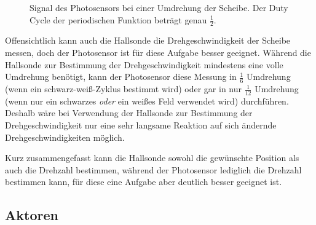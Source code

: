 \documentclass{kis}
\begin{document}
\begin{figure}
	\centering
	
	\caption[Signal des Photosensors bei einer Umdrehung der Scheibe.]{Signal des Photosensors bei einer Umdrehung der Scheibe. Der Duty Cycle der periodischen Funktion beträgt genau $\frac{1}{2}$.}
	\label{fig:photosensor}
\end{figure}

Offensichtlich kann auch die Hallsonde die Drehgeschwindigkeit der Scheibe messen, doch der Photosensor ist für diese Aufgabe besser geeignet. Während die Hallsonde zur Bestimmung der Drehgeschwindigkeit mindestens eine volle Umdrehung benötigt, kann der Photosensor diese Messung in $\frac{1}{6}$ Umdrehung (wenn ein schwarz-weiß-Zyklus bestimmt wird) oder gar in nur $\frac{1}{12}$ Umdrehung (wenn nur ein schwarzes \emph{oder} ein weißes Feld verwendet wird) durchführen. Deshalb wäre bei Verwendung der Hallsonde zur Bestimmung der Drehgeschwindigkeit nur eine sehr langsame Reaktion auf sich ändernde Drehgeschwindigkeiten möglich.

Kurz zusammengefasst kann die Hallsonde sowohl die gewünschte Position als auch die Drehzahl bestimmen, während der Photosensor lediglich die Drehzahl bestimmen kann, für diese eine Aufgabe aber deutlich besser geeignet ist.

\clearpage
\subsection{Aktoren}
\end{document}
